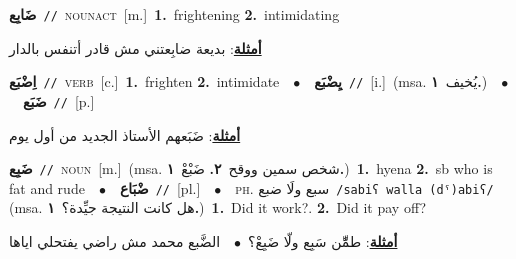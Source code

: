 \documentclass[10pt,a4paper,twoside]{article} %
\begin{document}
\begin{multicols}{2}
{{{{{\setlength\topsep{0pt}\textbf{\foreignlanguage{arabic}{ضَابِع}}\ {\color{gray}\texttt{//}\color{black}}\ \textsc{noun\textunderscore act}\ [m.]\ \textbf{1.}~frightening  \textbf{2.}~intimidating\  \begin{flushright}\color{gray}\foreignlanguage{arabic}{\textbf{\underline{\foreignlanguage{arabic}{أمثلة}}}: بديعة ضابِعتني مش قادر أتنفس بالدار}\end{flushright}\color{black}} \vspace{2mm}

{\setlength\topsep{0pt}\textbf{\foreignlanguage{arabic}{اِضْبَع}}\ {\color{gray}\texttt{//}\color{black}}\ \textsc{verb}\ [c.]\ \textbf{1.}~frighten  \textbf{2.}~intimidate\ \ $\bullet$\ \ \setlength\topsep{0pt}\textbf{\foreignlanguage{arabic}{يِضْبَع}}\ {\color{gray}\texttt{//}\color{black}}\ [i.]\ \color{gray}(msa. \foreignlanguage{arabic}{يُخيف}~\foreignlanguage{arabic}{\textbf{١.}})\color{black}\ \ $\bullet$\ \ \setlength\topsep{0pt}\textbf{\foreignlanguage{arabic}{ضَبَع}}\ {\color{gray}\texttt{//}\color{black}}\ [p.]\  \begin{flushright}\color{gray}\foreignlanguage{arabic}{\textbf{\underline{\foreignlanguage{arabic}{أمثلة}}}: ضَبَعهم الأستاذ الجديد من أول يوم}\end{flushright}\color{black}} \vspace{2mm}

{\setlength\topsep{0pt}\textbf{\foreignlanguage{arabic}{ضَبِع}}\ {\color{gray}\texttt{//}\color{black}}\ \textsc{noun}\ [m.]\ \color{gray}(msa. \foreignlanguage{arabic}{شخص سمين ووقح}~\foreignlanguage{arabic}{\textbf{٢.}}  \foreignlanguage{arabic}{ضَبْعْ}~\foreignlanguage{arabic}{\textbf{١.}})\color{black}\ \textbf{1.}~hyena  \textbf{2.}~sb who is fat and rude\ \ $\bullet$\ \ \setlength\topsep{0pt}\textbf{\foreignlanguage{arabic}{ضْبَاع}}\ {\color{gray}\texttt{//}\color{black}}\ [pl.]\ \ $\bullet$\ \ \textsc{ph.} \color{gray} \foreignlanguage{arabic}{سبع ولَا ضبع}\color{black}\ {\color{gray}\texttt{/{\sffamily sabiʕ walla (dˤ)abiʕ}/}\color{black}}\ \color{gray} (msa. \foreignlanguage{arabic}{هل كانت النتيجة جيِّدة؟}~\foreignlanguage{arabic}{\textbf{١.}})\color{black}\ \textbf{1.}~Did it work?.  \textbf{2.}~Did it pay off?\  \begin{flushright}\color{gray}\foreignlanguage{arabic}{\textbf{\underline{\foreignlanguage{arabic}{أمثلة}}}: طمِّّن سَبِع ولّا ضَبِعْ؟\ $\bullet$\ \  الضَّبع محمد مش راضي يفتحلي اياها}\end{flushright}\color{black}} \vspace{2mm}

}}}}
\end{multicols}
\end{document}
